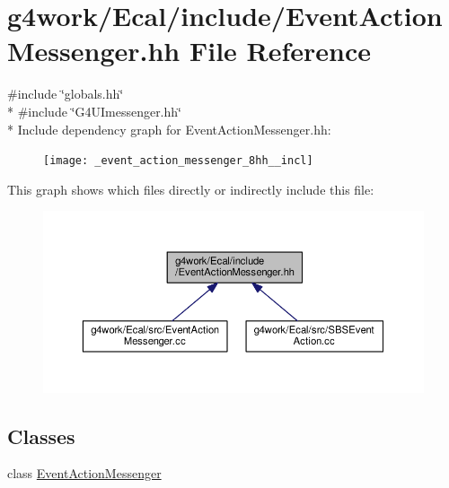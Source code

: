 \hypertarget{_event_action_messenger_8hh}{\section{g4work/\-Ecal/include/\-Event\-Action\-Messenger.hh File Reference}
\label{_event_action_messenger_8hh}
}
{\ttfamily \#include \char`\"{}globals.\-hh\char`\"{}}\\*
{\ttfamily \#include \char`\"{}G4\-U\-Imessenger.\-hh\char`\"{}}\\*
Include dependency graph for Event\-Action\-Messenger.\-hh\-:\nopagebreak
\begin{figure}[H]
\begin{center}
\leavevmode
\texttt{[image: \_event\_action\_messenger\_8hh\_\_incl]}
\end{center}
\end{figure}
This graph shows which files directly or indirectly include this file\-:\nopagebreak
\begin{figure}[H]
\begin{center}
\leavevmode
\includegraphics[width=350pt]{_event_action_messenger_8hh__dep__incl}
\end{center}
\end{figure}
\subsection*{Classes}
\begin{DoxyCompactItemize}
\item 
class \hyperlink{class_event_action_messenger}{Event\-Action\-Messenger}
\end{DoxyCompactItemize}

